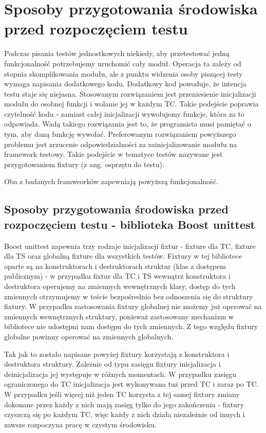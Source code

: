 \documentclass[12pt,a4paper,notitlepage]{report}
\begin{document}
\chapter{Sposoby przygotowania środowiska przed rozpoczęciem testu}

Podczas pisania testów jednostkowych niekiedy, aby przetestować jedną funkcjonalność potrzebujemy uruchomić cały moduł. Operacja ta zależy od stopnia skomplikowania modułu, ale z punktu widzenia osoby piszącej testy wymaga napisania dodatkowego kodu. Dodatkowy kod powoduje, że intencja testu staje się niejasna. 
Stosowanym rozwiązaniem jest przeniesienie inicjalizacji modułu do osobnej funkcji i wolanie jej w każdym TC. Takie podejście poprawia czytelność kodu - zamiast całej inicjalizacji wywołujemy funkcje, która za to odpowiada. Wadą takiego rozwiązania jest to, że programista musi pamiętać o tym, aby daną funkcję wywołać.
Preferowanym rozwiązaniem powyższego problemu jest zrzucenie odpowiedzialności za zainicjalizowanie modułu na framework testowy. Takie podejście w tematyce testów nazywane jest przygotowaniem fixtury (z ang. osprzętu do testu).

Oba z badanych framweorków zapewniają powyższą funkcjonalność.

\section{Sposoby przygotowania środowiska przed rozpoczęciem testu - biblioteka Boost unittest}

Boost unittest zapewnia trzy rodzaje inicjalizacji fixtur - fixture dla TC, fixture dla TS oraz globalną fixture dla wszystkich testów. Fixtury w tej bibliotece oparte są na konstruktorach i destruktorach struktur (klas z dostępem publicznym) - w przypadku fixtur dla TC i TS wewnątrz konstruktora i destruktora operujemy na zmiennych wewnętrznych klasy, dostęp do tych zmiennych otrzymujemy w teście bezpośrednio bez odnoszenia się do struktury fixtury.
W przypadku zastosowania fixtury globalnej nie możemy już operować na zmiennych wewnętrznych struktury, ponieważ zastosowany mechanizm w bibliotece nie udostępni nam dostępu do tych zmiennych. Z tego względu fixtury globalne powinny operować na zmiennych globalnych.

Tak jak to zostało napisane powyżej fixtury korzystają z konstruktora i destruktora struktury. Zależnie od typu zasięgu fixtury inicjalizacja i deinicjalizacja jej występuje w różnych momentach. W przypadku zasięgu ograniczonego do TC inicjalizacja jest wykonywana tuż przed TC i zaraz po TC. W przypadku jeśli więcej niż jeden TC korzysta z tej samej fixtury zmiany dokonane przez każdy z nich mają zasięg tylko do jego zakończenia - fixtury czyszczą się po każdym TC, więc każdy z nich działa niezależnie od innych i zawsze rozpoczyna pracę w czystym środowisku.
\end{document}
